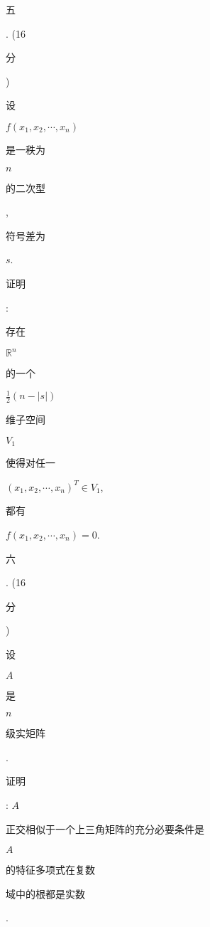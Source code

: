 \documentclass[10pt]{article}
\begin{document}
\begin{CJK}{UTF8}{mj}五\end{CJK}. (16 \begin{CJK}{UTF8}{mj}分\end{CJK}) \begin{CJK}{UTF8}{mj}设\end{CJK} $f\left(x_{1}, x_{2}, \cdots, x_{n}\right)$ \begin{CJK}{UTF8}{mj}是一秩为\end{CJK} $n$ \begin{CJK}{UTF8}{mj}的二次型\end{CJK}, \begin{CJK}{UTF8}{mj}符号差为\end{CJK} $s$. \begin{CJK}{UTF8}{mj}证明\end{CJK}: \begin{CJK}{UTF8}{mj}存在\end{CJK} $\mathbb{R}^{n}$ \begin{CJK}{UTF8}{mj}的一个\end{CJK} $\frac{1}{2}(n-|s|)$ \begin{CJK}{UTF8}{mj}维子空间\end{CJK} $V_{1}$ \begin{CJK}{UTF8}{mj}使得对任一\end{CJK} $\left(x_{1}, x_{2}, \cdots, x_{n}\right)^{T} \in V_{1}$, \begin{CJK}{UTF8}{mj}都有\end{CJK} $f\left(x_{1}, x_{2}, \cdots, x_{n}\right)=0$.

\begin{CJK}{UTF8}{mj}六\end{CJK}. (16 \begin{CJK}{UTF8}{mj}分\end{CJK}) \begin{CJK}{UTF8}{mj}设\end{CJK} $A$ \begin{CJK}{UTF8}{mj}是\end{CJK} $n$ \begin{CJK}{UTF8}{mj}级实矩阵\end{CJK}. \begin{CJK}{UTF8}{mj}证明\end{CJK}: $A$ \begin{CJK}{UTF8}{mj}正交相似于一个上三角矩阵的充分必要条件是\end{CJK} $A$ \begin{CJK}{UTF8}{mj}的特征多项式在复数\end{CJK} \begin{CJK}{UTF8}{mj}域中的根都是实数\end{CJK}.
\end{document}
